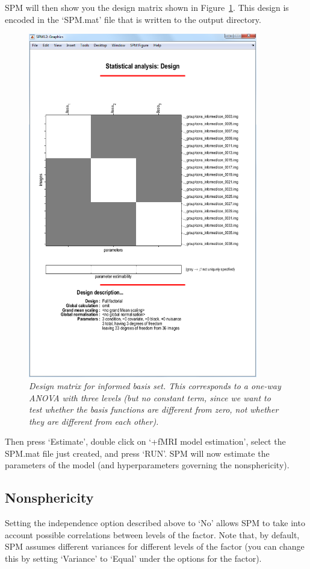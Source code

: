 SPM will then show you the design matrix shown in Figure~\ref{informed_design}. This design is encoded in the `SPM.mat' file that is written to the output directory.
\begin{figure}
\begin{center}
\includegraphics[width=100mm]{faces_group/informed_design}
\caption{\em Design matrix for informed basis set. This corresponds to a one-way ANOVA with three levels (but no constant term, since we want to test whether the basis functions are different from zero, not whether they are different from each other). \label{informed_design}}
\end{center}
\end{figure}
Then press `Estimate', double click on `+fMRI model   estimation', select the SPM.mat file just created, and press `RUN'.
SPM will now estimate the parameters of the model (and hyperparameters governing the nonsphericity).

\subsection{Nonsphericity}

Setting the independence option described above to `No' allows SPM to take into account possible correlations between levels of the factor. Note that, by default, SPM assumes different variances 
for different levels of the factor (you can change this by setting `Variance' to `Equal' under the options for the factor). 

